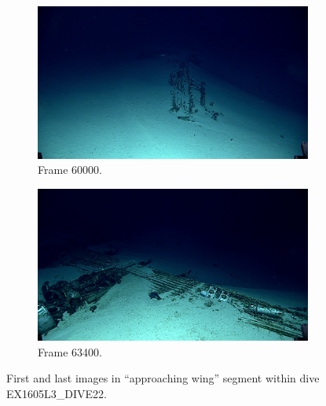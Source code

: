 \documentclass[letterpaper,12pt]{article}
\begin{document}
\begin{figure}[p]
    \centering
    \begin{subfigure}[b]{0.48\textwidth}
        \includegraphics[width=\textwidth]{images/image_060000.png}
        \caption{Frame 60000.}
        \label{fig:ex1605l3_dive22_approaching_wing_begin}
    \end{subfigure}
    \begin{subfigure}[b]{0.48\textwidth}
        \includegraphics[width=\textwidth]{images/image_063400.png}
        \caption{Frame 63400.}
        \label{fig:ex1605l3_dive22_approaching_wing_end}
    \end{subfigure}
    \caption{First and last images in ``approaching wing'' segment within dive EX1605L3\_DIVE22.}
\end{figure}
\end{document}

